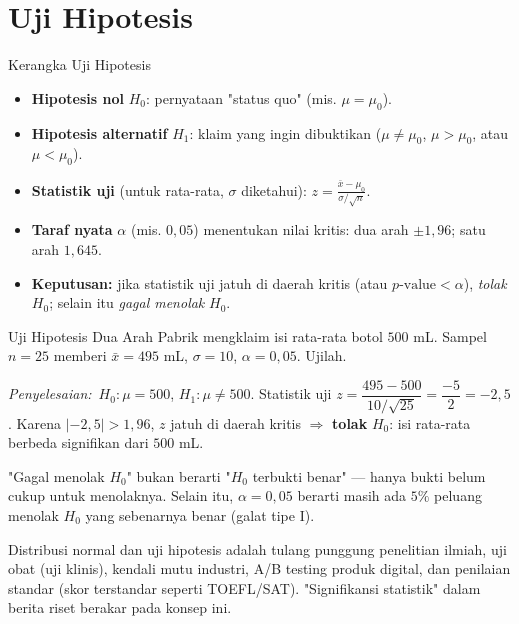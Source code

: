 \documentclass[11pt,a4paper]{report}
\theoremstyle{gaya}
\newcommand{\jawab}{\par\smallskip\noindent\textit{\textcolor{oranye}{Penyelesaian:}}\ }
\begin{document}
\section{Uji Hipotesis}
\begin{konsep}{Kerangka Uji Hipotesis}
\begin{itemize}[leftmargin=*,topsep=2pt]
  \item \textbf{Hipotesis nol} $H_0$: pernyataan "status quo" (mis. $\mu=\mu_0$).
  \item \textbf{Hipotesis alternatif} $H_1$: klaim yang ingin dibuktikan ($\mu\neq\mu_0$, $\mu>\mu_0$, atau $\mu<\mu_0$).
  \item \textbf{Statistik uji} (untuk rata-rata, $\sigma$ diketahui): $\displaystyle z=\frac{\bar x-\mu_0}{\sigma/\sqrt n}$.
  \item \textbf{Taraf nyata} $\alpha$ (mis. $0{,}05$) menentukan nilai kritis: dua arah $\pm1{,}96$; satu arah $1{,}645$.
  \item \textbf{Keputusan:} jika statistik uji jatuh di daerah kritis (atau $p\text{-value}<\alpha$), \emph{tolak} $H_0$; selain itu \emph{gagal menolak} $H_0$.
\end{itemize}
\end{konsep}

\begin{contoh}{Uji Hipotesis Dua Arah}
Pabrik mengklaim isi rata-rata botol $500$ mL. Sampel $n=25$ memberi $\bar x=495$ mL, $\sigma=10$, $\alpha=0{,}05$. Ujilah.

\jawab $H_0:\mu=500$, $H_1:\mu\neq500$. Statistik uji $z=\dfrac{495-500}{10/\sqrt{25}}=\dfrac{-5}{2}=-2{,}5$. Karena $|-2{,}5|>1{,}96$, $z$ jatuh di daerah kritis $\Rightarrow$ \textbf{tolak} $H_0$: isi rata-rata berbeda signifikan dari $500$ mL.
\end{contoh}

\begin{kesalahan}
"Gagal menolak $H_0$" bukan berarti "$H_0$ terbukti benar" --- hanya bukti belum cukup untuk menolaknya. Selain itu, $\alpha=0{,}05$ berarti masih ada $5\%$ peluang menolak $H_0$ yang sebenarnya benar (galat tipe I).
\end{kesalahan}

\begin{dunianyata}
Distribusi normal dan uji hipotesis adalah tulang punggung penelitian ilmiah, uji obat (uji klinis), kendali mutu industri, A/B testing produk digital, dan penilaian standar (skor terstandar seperti TOEFL/SAT). "Signifikansi statistik" dalam berita riset berakar pada konsep ini.
\end{dunianyata}
\end{document}

